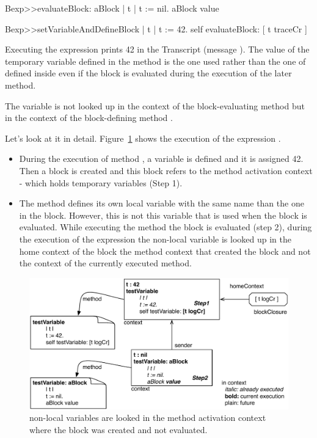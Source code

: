 \documentclass[a4paper,10pt,twoside]{book}
\begin{document}
\begin{code}{}
Bexp>>evaluateBlock: aBlock
	| t |
	t := nil.
	aBlock value

Bexp>>setVariableAndDefineBlock
	| t |
	t := 42.
	self evaluateBlock: [ t traceCr ]
\end{code}

Executing the  expression prints 42 in the Transcript (message ). The value of the temporary variable  defined in the  method is the one used rather than the one of  defined inside  even if the block is evaluated during the execution of the later method.

The variable  is not looked up in the context of the  block-evaluating method  but in the context of the block-defining method .

Let's look at it in detail. Figure~\ref{fig:variable} shows the execution of the expression . 

\begin{itemize}
\item During the execution of method , a variable  is defined and it is assigned 42. Then a block is created and this block refers to the method activation context - which holds temporary variables (Step 1). 

\item The method  defines its own local variable  with the same name than the one in the block. However, this is not this variable that is used when the block is evaluated. While executing the method  the block is evaluated (step 2), during the execution of the expression  the non-local variable  is looked up in the home context of the block \ie the method context that created the block and not the context of the currently executed method.
\end{itemize}

\begin{figure}[!h]
\begin{center}\includegraphics[width=\textwidth]{variable}
\caption{ non-local variables are looked in the method activation context where the block was created and not evaluated.\label{fig:variable} }
\end{center}
\end{figure}
\end{document}
